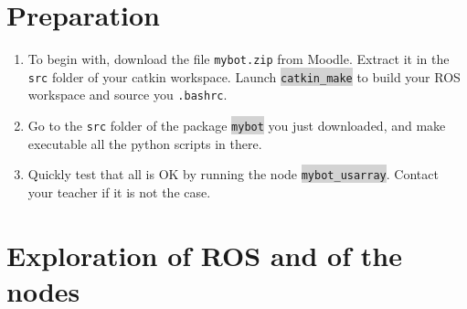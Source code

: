 \documentclass[10pt,a4paper,english]{exam}
\newcounter{mainmemorder}
\newcommand{\save}{\setcounter{mainmemorder}{\value{enumi}}}
\newcommand{\mytext}[1]{\colorbox{lightgray}{\texttt{#1}}}
\begin{document}
\section*{Preparation}
\begin{enumerate}
	\item To begin with, download the file \texttt{mybot.zip} from Moodle. Extract it in the
	      \texttt{src} folder of your catkin workspace. Launch \mytext{catkin\_make} to build your
	      ROS workspace and source you \texttt{.bashrc}.
	\item Go to the \texttt{src} folder of the package \mytext{mybot} you just downloaded, and make
	      executable all the python scripts in there.
	\item Quickly test that all is OK by running the node \mytext{mybot\_usarray}. Contact your
	      teacher if it is not the case.
	      \save
\end{enumerate}


\section{Exploration of ROS and of the nodes}
\end{document}
